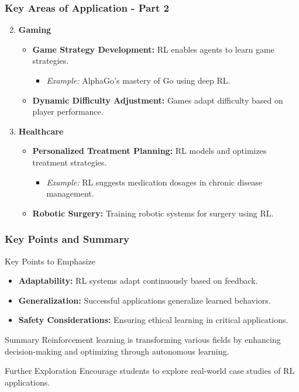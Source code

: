 \documentclass[aspectratio=169]{beamer}
\begin{document}
\begin{frame}[fragile]
    \frametitle{Key Areas of Application - Part 2}
    \begin{enumerate}
        \setcounter{enumi}{1} %
        \item \textbf{Gaming}
            \begin{itemize}
                \item \textbf{Game Strategy Development:} RL enables agents to learn game strategies.
                \begin{itemize}
                    \item \textit{Example:} AlphaGo's mastery of Go using deep RL.
                \end{itemize}
                \item \textbf{Dynamic Difficulty Adjustment:} Games adapt difficulty based on player performance.
            \end{itemize}
        \item \textbf{Healthcare}
            \begin{itemize}
                \item \textbf{Personalized Treatment Planning:} RL models and optimizes treatment strategies.
                \begin{itemize}
                    \item \textit{Example:} RL suggests medication dosages in chronic disease management.
                \end{itemize}
                \item \textbf{Robotic Surgery:} Training robotic systems for surgery using RL.
            \end{itemize}
    \end{enumerate}
\end{frame}

\begin{frame}[fragile]
    \frametitle{Key Points and Summary}
    \begin{block}{Key Points to Emphasize}
        \begin{itemize}
            \item \textbf{Adaptability:} RL systems adapt continuously based on feedback.
            \item \textbf{Generalization:} Successful applications generalize learned behaviors.
            \item \textbf{Safety Considerations:} Ensuring ethical learning in critical applications.
        \end{itemize}
    \end{block}
    \begin{block}{Summary}
        Reinforcement learning is transforming various fields by enhancing decision-making and optimizing through autonomous learning. 
    \end{block}
    \begin{block}{Further Exploration}
        Encourage students to explore real-world case studies of RL applications.
    \end{block}
\end{frame}
\end{document}
